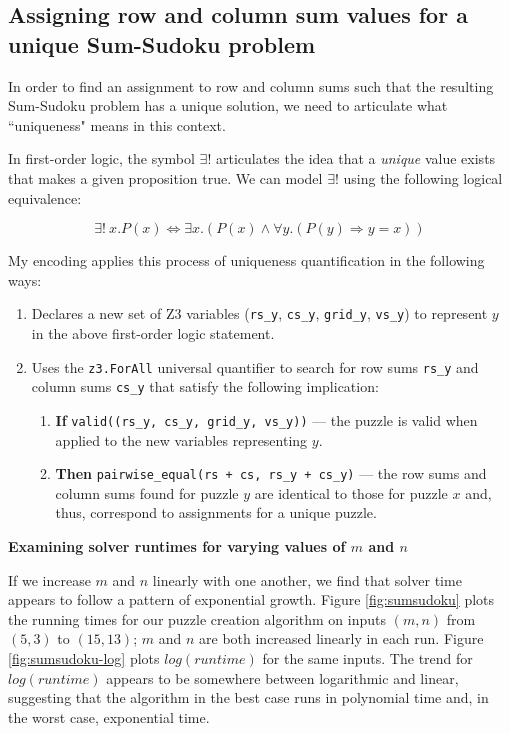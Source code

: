 \documentclass{article}
\newcommand{\code}[1]{\texttt{#1}}
\begin{document}
\subsection{Assigning row and column sum values for a unique Sum-Sudoku problem}

In order to find an assignment to row and column sums such that the resulting Sum-Sudoku problem has a unique solution, we need to articulate what ``uniqueness" means in this context.


In first-order logic, the symbol $\exists!$ articulates the idea that a \emph{unique} value exists that makes a given proposition true. We can model $\exists!$ using the following logical equivalence:

$$
\exists!~x.P(x) \iff \exists x.(P(x) \land \forall y.(P(y) \Longrightarrow y = x))
$$

My encoding applies this process of uniqueness quantification in the following ways:

\begin{enumerate}
  \item Declares a new set of Z3 variables (\code{rs\_y}, \code{cs\_y}, \code{grid\_y}, \code{vs\_y}) to represent $y$ in the above first-order logic statement.
  \item Uses the \code{z3.ForAll} universal quantifier to search for row sums \code{rs\_y} and column sums \code{cs\_y} that satisfy the following implication:
  \begin{enumerate}
    \item \textbf{If} \code{valid((rs\_y, cs\_y, grid\_y, vs\_y))} — the puzzle is valid when applied to the new variables representing $y$.
    \item \textbf{Then} \code{pairwise\_equal(rs + cs, rs\_y + cs\_y)} — the row sums and column sums found for puzzle $y$ are identical to those for puzzle $x$ and, thus, correspond to assignments for a unique puzzle.
  \end{enumerate}
\end{enumerate}

\textbf{Examining solver runtimes for varying values of $m$ and $n$}

If we increase $m$ and $n$ linearly with one another, we find that solver time appears to follow a pattern of exponential growth. Figure \ref{fig:sumsudoku} plots the running times for our puzzle creation algorithm on inputs $(m, n)$ from $(5, 3)$ to $(15, 13)$; $m$ and $n$ are both increased linearly in each run. Figure \ref{fig:sumsudoku-log} plots $log(runtime)$ for the same inputs. The trend for $log(runtime)$ appears to be somewhere between logarithmic and linear, suggesting that the algorithm in the best case runs in polynomial time and, in the worst case, exponential time.
\end{document}
